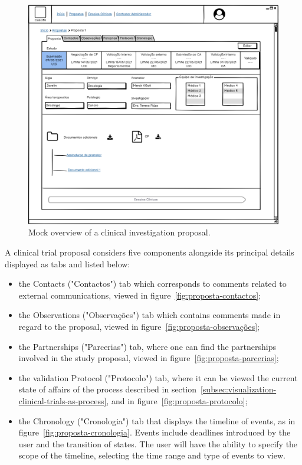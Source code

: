 \begin{figure}[H]
    \centering
    \includegraphics[scale=0.35]{images/proposta-detalhe.png}
    \caption{Mock overview of a clinical investigation proposal.}
    \label{fig:proposta-detalhe}
\end{figure}

A clinical trial proposal considers five components alongside its principal details displayed as tabs and listed below: 
\begin{itemize}
    \item the Contacts ("Contactos") tab which corresponds to comments related to external communications, viewed in figure~\ref{fig:proposta-contactos};
    \item the Observations ("Observações") tab which contains comments made in regard to the proposal, viewed in figure~\ref{fig:proposta-observações};
    \item the Partnerships ("Parcerias") tab, where one can find the partnerships involved in the study proposal, viewed in figure~\ref{fig:proposta-parcerias};
    \item the validation Protocol ("Protocolo") tab, where it can be viewed the current state of affairs of the process described in section~\ref{subsec:visualization-clinical-trials-as-process}, and in figure~\ref{fig:proposta-protocolo};
    \item the Chronology ("Cronologia") tab that displays the timeline of events, as in figure~\ref{fig:proposta-cronologia}. Events include deadlines introduced by the user and the transition of states. The user will have the ability to specify the scope of the timeline, selecting the time range and type of events to view. 
\end{itemize}

